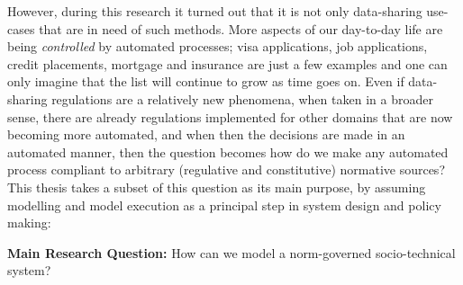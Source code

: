 However, during this research it turned out that it is not only data-sharing use-cases that are in need of such methods. More aspects of our day-to-day life are being \textit{controlled} by automated processes; visa applications, job applications, credit placements, mortgage and insurance are just a few examples and one can only imagine that the list will continue to grow as time goes on. Even if data-sharing regulations are a relatively new phenomena, when taken in a broader sense, there are already regulations implemented for other domains that are now becoming more automated, and when then the decisions are made in an automated manner, then the question becomes how do we make any automated process compliant to arbitrary (regulative and constitutive) normative sources? This thesis takes a subset of this question as its main purpose, by assuming modelling and model execution as a principal step in system design and policy making:


\textbf{Main Research Question:} How can we model a norm-governed socio-technical system?



